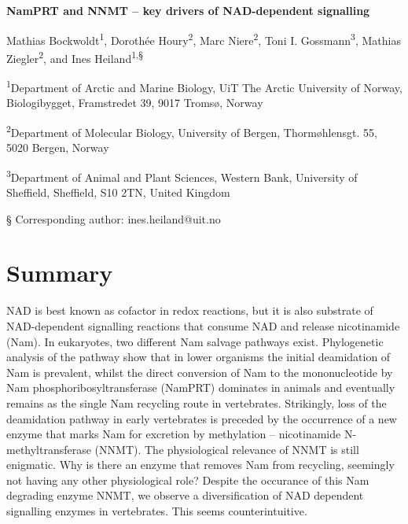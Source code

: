 \documentclass[paper=a4, 12pt]{scrartcl}
\begin{document}
\noindent
{\huge\sffamily\bfseries NamPRT and NNMT – key drivers of NAD-dependent signalling \par}

\vspace{15mm}

\noindent
Mathias Bockwoldt\textsuperscript{1}, Dorothée Houry\textsuperscript{2}, Marc Niere\textsuperscript{2}, Toni I. Gossmann\textsuperscript{3}, Mathias Ziegler\textsuperscript{2}, and Ines Heiland\textsuperscript{1,§}

\vspace{1cm}

\noindent
\textsuperscript{1}Department of Arctic and Marine Biology, UiT The Arctic University of Norway, Biologibygget, Framstredet 39, 9017 Tromsø, Norway

\noindent
\textsuperscript{2}Department of Molecular Biology, University of Bergen, Thormøhlensgt. 55, 5020 Bergen, Norway

\noindent
\textsuperscript{3}Department of Animal and Plant Sciences, Western Bank, University of Sheffield, Sheffield, S10 2TN, United Kingdom

\noindent
§ Corresponding author: ines.heiland@uit.no


\section{Summary}

NAD is best known as cofactor in redox reactions, but it is also substrate of NAD-dependent signalling reactions that consume NAD and release nicotinamide (Nam). In eukaryotes, two different Nam salvage pathways exist. Phylogenetic analysis of the pathway show that in lower organisms the initial deamidation of Nam is prevalent, whilst the direct conversion of Nam to the mononucleotide by Nam phosphoribosyltransferase (NamPRT) dominates in animals and eventually remains as the single Nam recycling route in vertebrates. Strikingly, loss of the deamidation pathway in early vertebrates is preceded by the occurrence of a new enzyme that marks Nam for excretion by methylation – nicotinamide N-methyltransferase (NNMT). The physiological relevance of NNMT is still enigmatic. Why is there an enzyme that removes Nam from recycling, seemingly not having any other physiological role? Despite the occurance of this Nam degrading enzyme NNMT, we observe a diversification of NAD dependent signalling enzymes in vertebrates. This seems counterintuitive.
\end{document}
